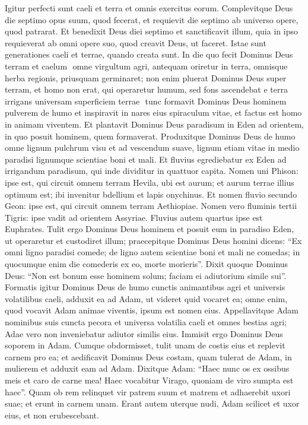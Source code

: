\begin{biblechapter}
\begin{biblechapter}
\verse Igitur perfecti sunt caeli et terra et omnis exercitus eorum. 
\verse Complevitque Deus die septimo opus suum, quod fecerat, et requievit die septimo ab universo opere, quod patrarat. 
\verse Et benedixit Deus diei septimo et sanctificavit illum, quia in ipso requieverat ab omni opere suo, quod creavit Deus, ut faceret.
 \verse Istae sunt generationes caeli et terrae, quando creata sunt.
 In die quo fecit Dominus Deus terram et caelum ­ 
\verse omne virgultum agri, antequam oriretur in terra, omnisque herba regionis, priusquam germinaret; non enim pluerat Dominus Deus super terram, et homo non erat, qui operaretur humum, 
 \verse sed fons ascendebat e terra irrigans universam superficiem terrae ­ 
\verse tunc formavit Dominus Deus hominem pulverem de humo et inspiravit in nares eius spiraculum vitae, et factus est homo in animam viventem.
 \verse Et plantavit Dominus Deus paradisum in Eden ad orientem, in quo posuit hominem, quem formaverat. 
\verse Produxitque Dominus Deus de humo omne lignum pulchrum visu et ad vescendum suave, lignum etiam vitae in medio paradisi lignumque scientiae boni et mali.
 \verse Et fluvius egrediebatur ex Eden ad irrigandum paradisum, qui inde dividitur in quattuor capita. \verse Nomen uni Phison: ipse est, qui circuit omnem terram Hevila, ubi est aurum; 
\verse et aurum terrae illius optimum est; ibi invenitur bdellium et lapis onychinus. 
\verse Et nomen fluvio secundo Geon: ipse est, qui circuit omnem terram Aethiopiae. 
\verse Nomen vero fluminis tertii Tigris: ipse vadit ad orientem Assyriae. Fluvius autem quartus ipse est Euphrates.
 \verse Tulit ergo Dominus Deus hominem et posuit eum in paradiso Eden, ut operaretur et custodiret illum; 
\verse praecepitque Dominus Deus homini dicens: “Ex omni ligno paradisi comede; 
\verse de ligno autem scientiae boni et mali ne comedas; in quocumque enim die comederis ex eo, morte morieris”.
 \verse Dixit quoque Dominus Deus: “Non est bonum esse hominem solum; faciam ei adiutorium simile sui”. 
\verse Formatis igitur Dominus Deus de humo cunctis animantibus agri et universis volatilibus caeli, adduxit ea ad Adam, ut videret quid vocaret ea; omne enim, quod vocavit Adam animae viventis, ipsum est nomen eius. 
\verse Appellavitque Adam nominibus suis cuncta pecora et universa volatilia caeli et omnes bestias agri; Adae vero non inveniebatur adiutor similis eius. 
\verse Immisit ergo Dominus Deus soporem in Adam. Cumque obdormisset, tulit unam de costis eius et replevit carnem pro ea; 
\verse et aedificavit Dominus Deus costam, quam tulerat de Adam, in mulierem et adduxit eam ad Adam. 
\verse Dixitque Adam:
 “Haec nunc os ex ossibus meis
 et caro de carne mea!
 Haec vocabitur Virago,
 quoniam de viro sumpta est haec”.
 \verse Quam ob rem relinquet vir patrem suum et matrem et adhaerebit uxori suae; et erunt in carnem unam. 
\verse Erant autem uterque nudi, Adam scilicet et uxor eius, et non erubescebant.
 

\end{biblechapter}
\end{biblechapter}
